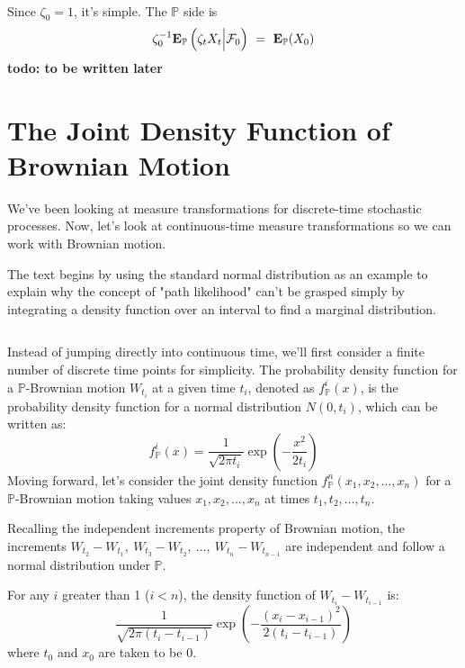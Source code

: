 \documentclass[uplatex,a4j,12pt,dvipdfmx]{jsarticle}
\begin{document}
	\ \\

	Since $\zeta_{0}=1$, it's simple.
	The $\mathbb{P}$ side is
	\begin{eqnarray*}
		\zeta_{0}^{-1}
		{\bf E}_{\mathbb{P}}
		\left( \zeta_{t} X_{t} \Big| \mathcal{F}_{0} \right)
		\ = \
		{\bf E}_{\mathbb{P}}
		( X_{0} )
	\end{eqnarray*}
	{\bf todo: to be written later}

\fi

\section{The Joint Density Function of Brownian Motion}
We've been looking at measure transformations for discrete-time stochastic processes. Now, let's look at continuous-time measure transformations so we can work with Brownian motion.

The text begins by using the standard normal distribution as an example to explain why the concept of "path likelihood" can't be grasped simply by integrating a density function over an interval to find a marginal distribution.

${}$

Instead of jumping directly into continuous time, we'll first consider a finite number of discrete time points for simplicity.
The probability density function for a $\mathbb{P}$-Brownian motion $W_{t_{i}}$ at a given time $t_{i}$, denoted as $f^{i}_{\mathbb{P}}(x)$, is the probability density function for a normal distribution $N(0,t_{i})$, which can be written as:
%
$$
	\displaystyle
	f^{i}_{\mathbb{P}}(x)
	=
	\dfrac{1}{ \sqrt{2 \pi t_{i} } }
	\exp \left( {- \frac{x^{2}}{2 t_{i}} } \right)
$$
%
Moving forward, let's consider the joint density function $f^{n}_{\mathbb{P}} (x_{1} , x_{2} , ... ,x_{n})$ for a $\mathbb{P}$-Brownian motion taking values $x_{1},x_{2},...,x_{n}$ at times $t_{1},t_{2},...,t_{n}$.

Recalling the independent increments property of Brownian motion, the increments
$
	W_{t_{2}} - W_{t_{1}}, \
	W_{t_{3}} - W_{t_{2}}, \
	..., \
	W_{t_{n}} - W_{t_{n-1}}
$
are independent and follow a normal distribution under $\mathbb{P}$.

For any $i$ greater than 1 ($i<n$), the density function of $W_{t_{i}} - W_{t_{i-1}}$ is:
%
$$
	\displaystyle
	\dfrac{1}{ \sqrt{2 \pi (t_{i} - t_{i-1}) } }
	\exp \left( {- \frac{ (x_{i} - x_{i-1}  )^{2}}{2 ( t_{i} - t_{i-1})  } } \right)
$$
%
where $t_{0}$ and $x_{0}$ are taken to be 0.
\end{document}
